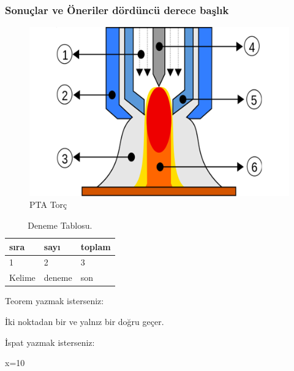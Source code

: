 \subsubsection{Sonuçlar ve Öneriler dördüncü derece başlık}
\lipsum[1-2]
\begin{figure}[h]
\centering
\includegraphics[width=\textwidth]{gorseller/ptaTorc}
\caption{PTA Torç}\label{fig:PtaTorc1}
\end{figure}
\lipsum[1-2]
\begin{table}
\centering
\caption{Deneme Tablosu.}\label{tab:den1}
\begin{tabular}{|l|l|l|}
\hline
sıra   & sayı   & toplam \\ \hline
1      & 2      & 3      \\ \hline
Kelime & deneme & son    \\ \hline
\end{tabular}
\end{table}

Teorem yazmak isterseniz:
\begin{theorem}[Öklid]
 İki noktadan bir ve yalnız bir doğru geçer.
\end{theorem}

İspat yazmak isterseniz:
\begin{ispat}
x=10
\end{ispat}